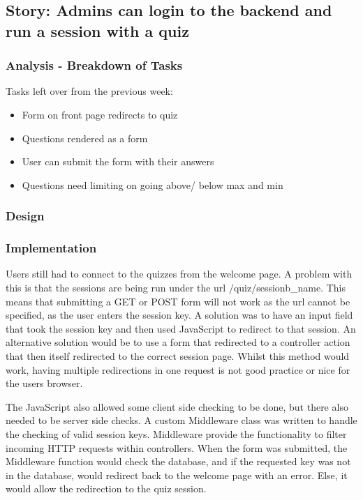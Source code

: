 \subsection{Story: Admins can login to the backend and run a session with a quiz}
\subsubsection{Analysis - Breakdown of Tasks}
Tasks left over from the previous week:
\begin{itemize}
	\item Form on front page redirects to quiz
	\item Questions rendered as a form
	\item User can submit the form with their answers
	\item Questions need limiting on going above/ below max and min
\end{itemize}
\subsubsection{Design}
\subsubsection{Implementation}
Users still had to connect to the quizzes from the welcome page. A problem with this is that the sessions are being run under the url /quiz/sessionb\_name. This means that submitting a GET or POST form will not work as the url cannot be specified, as the user enters the session key. A solution was to have an input field that took the session key and then used JavaScript to redirect to that session. An alternative solution would be to use a form that redirected to a controller action that then itself redirected to the correct session page. Whilst this method would work, having multiple redirections in one request is not good practice or nice for the users browser.

The JavaScript also allowed some client side checking to be done, but there also needed to be server side checks. A custom Middleware class was written to handle the checking of valid session keys. Middleware provide the functionality to filter incoming HTTP requests within controllers\cite{laravel-middleware}. When the form was submitted, the Middleware function would check the database, and if the requested key was not in the database, would redirect back to the welcome page with an error. Else, it would allow the redirection to the quiz session.

